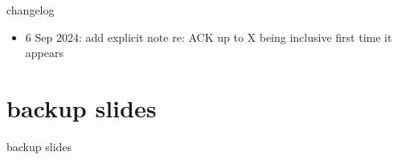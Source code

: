 \date{}
\title{}
\date{}
\usepackage{pgfplots}
\pgfplotsset{compat=1.16}

\begin{frame}
    \titlepage
\end{frame}

{\changelogmode
\begin{frame}{changelog}
    \begin{itemize}
    \item 6 Sep 2024: add explicit note re: ACK up to X being inclusive first time it appears
    \end{itemize}
\end{frame}
}



\section{backup slides}
\begin{frame}{backup slides}
\end{frame}


